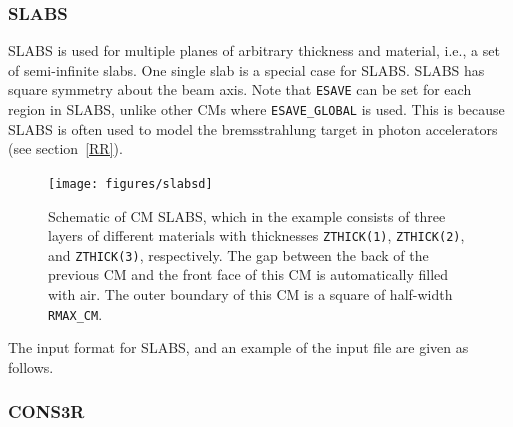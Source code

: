 \documentclass[12pt,twoside]{article}
\begin{document}
\newpage



\subsubsection{SLABS}
\renewcommand{\rightmark}{SLABS CM}

SLABS is used for multiple planes of arbitrary thickness and
material, i.e., a set
of semi-infinite slabs. One single slab is a special case for SLABS.
SLABS has square symmetry about the beam axis.  Note that \verb+ESAVE+
can be set for each region in SLABS, unlike other CMs where
\verb+ESAVE_GLOBAL+ is used.  This is because SLABS is often used to model
the bremsstrahlung target in photon accelerators (see section~\ref{RR}).
 

\begin{figure}[htbp]
\begin{center}
\leavevmode
\mbox{}\hspace{0cm}
\texttt{[image: figures/slabsd]}
\caption[SLABS CM geometry]
{Schematic of CM SLABS, which in the example
consists of three layers of different materials with thicknesses
{\tt ZTHICK(1)}, {\tt ZTHICK(2)}, and {\tt ZTHICK(3)},
respectively. The gap between the back of the
previous CM and the front face of this CM is automatically filled with air. The
outer boundary of this CM is a square of half-width {\tt RMAX\_CM}.}
\label{fig_SLABSD}
\end{center}
\end{figure}

The input format for SLABS, and an example of the input file are given as
follows.

\begin{small}

\end{small}





\clearpage
\subsubsection{CONS3R}
\renewcommand{\rightmark}{CONS3R CM}
\label{sCONS3R}
\end{document}
